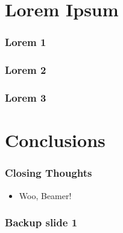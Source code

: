 \documentclass{beamer}
\begin{document}
	\section{Lorem Ipsum}
		\begin{frame}
			\frametitle{Lorem 1}
			\blindtext
		\end{frame}

		\begin{frame}
			\frametitle{Lorem 2}
			\blindtext
		\end{frame}

		\begin{frame}
			\frametitle{Lorem 3}
			\blindtext
		\end{frame}

	\section{Conclusions}
		\begin{frame}
			\frametitle{Closing Thoughts}
			\begin{itemize}
				\item Woo, Beamer!
			\end{itemize}
		\end{frame}
	
	\appendix
	\backupbegin
	  \begin{frame}
	    \frametitle{Backup slide 1}
	    \blindtext
	  \end{frame}
	\backupend
\end{document}
